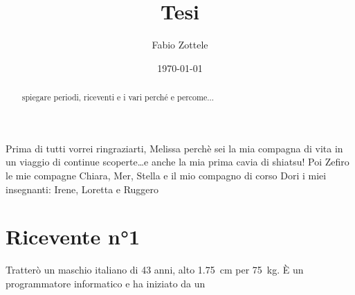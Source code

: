 \documentclass[12pt, openright, twoside]{report}
\begin{document}
\title{Tesi}
\author{Fabio Zottele}
\date{\today}
\maketitle
\begin{abstract}
spiegare periodi, riceventi e i vari perché e percome...
\end{abstract}
\begin{aknowledgements}
Prima di tutti vorrei ringraziarti, Melissa perchè sei la mia compagna di vita in un viaggio di continue scoperte\ldots e anche la mia prima cavia di shiatsu!
Poi Zefiro
le mie compagne Chiara, Mer, Stella e il mio compagno di corso Dori
i miei insegnanti: Irene, Loretta e Ruggero
\end{aknowledgements}
\chapter*{Ricevente n°1}
Tratterò un maschio italiano di 43 anni, alto \SI{1,75}{\centi\metre}
per \SI{75}{\kilogram}. \`{E} un programmatore informatico e ha iniziato da un
\end{document}
